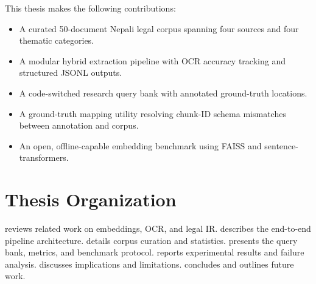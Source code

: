 This thesis makes the following contributions:
\begin{itemize}[leftmargin=*]
  \item A curated 50-document Nepali legal corpus spanning four sources and four thematic categories.
  \item A modular hybrid extraction pipeline with OCR accuracy tracking and structured JSONL outputs.
  \item A code-switched research query bank with annotated ground-truth locations.
  \item A ground-truth mapping utility resolving chunk-ID schema mismatches between annotation and corpus.
  \item An open, offline-capable embedding benchmark using FAISS and sentence-transformers.
\end{itemize}

\section{Thesis Organization}
\label{sec:organization}

 reviews related work on embeddings, OCR, and legal IR.
 describes the end-to-end pipeline architecture.
 details corpus curation and statistics.
 presents the query bank, metrics, and benchmark protocol.
 reports experimental results and failure analysis.
 discusses implications and limitations.
 concludes and outlines future work.
